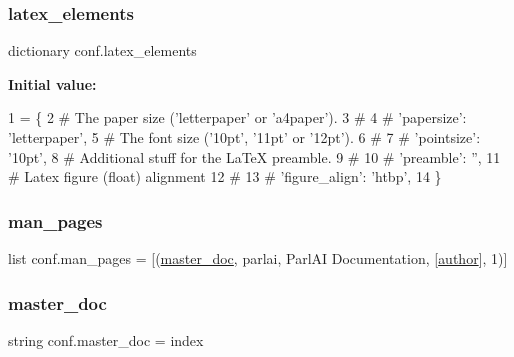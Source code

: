 \subsubsection{\texorpdfstring{latex\+\_\+elements}{latex\_elements}}
{\footnotesize\ttfamily dictionary conf.\+latex\+\_\+elements}

{\bfseries Initial value\+:}
\begin{DoxyCode}
1 =  \{
2     \textcolor{comment}{# The paper size ('letterpaper' or 'a4paper').}
3     \textcolor{comment}{#}
4     \textcolor{comment}{# 'papersize': 'letterpaper',}
5     \textcolor{comment}{# The font size ('10pt', '11pt' or '12pt').}
6     \textcolor{comment}{#}
7     \textcolor{comment}{# 'pointsize': '10pt',}
8     \textcolor{comment}{# Additional stuff for the LaTeX preamble.}
9     \textcolor{comment}{#}
10     \textcolor{comment}{# 'preamble': '',}
11     \textcolor{comment}{# Latex figure (float) alignment}
12     \textcolor{comment}{#}
13     \textcolor{comment}{# 'figure\_align': 'htbp',}
14 \}
\end{DoxyCode}
\mbox{\label{namespaceconf_a85efc5fee48a26fa2d651f6eeb38fc2b}} 
\subsubsection{\texorpdfstring{man\+\_\+pages}{man\_pages}}
{\footnotesize\ttfamily list conf.\+man\+\_\+pages = \mbox{[}(\hyperlink{namespaceconf_a6fcd7e5236f355b1e1a55f9d95988810}{master\+\_\+doc}, \textquotesingle{}parlai\textquotesingle{}, \textquotesingle{}Parl\+AI Documentation\textquotesingle{}, \mbox{[}\hyperlink{namespaceconf_a637c239d256432248aa8d9f3ab0b8c52}{author}\mbox{]}, 1)\mbox{]}}

\mbox{\label{namespaceconf_a6fcd7e5236f355b1e1a55f9d95988810}} 
\subsubsection{\texorpdfstring{master\+\_\+doc}{master\_doc}}
{\footnotesize\ttfamily string conf.\+master\+\_\+doc = \textquotesingle{}index\textquotesingle{}}

\mbox{\label{namespaceconf_a45653c983098153b78e33600e39230eb}} 
